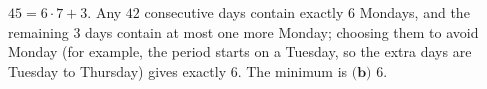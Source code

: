 $45=6\cdot7+3$. Any $42$ consecutive days contain exactly $6$ Mondays, and the remaining $3$ days contain at most one more Monday; choosing them to avoid Monday (for example, the period starts on a Tuesday, so the extra days are Tuesday to Thursday) gives exactly $6$. The minimum is $\boxed{\textbf{(b) }6}$.
